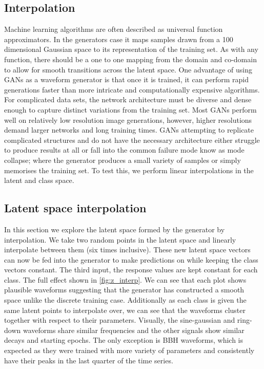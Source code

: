 \documentclass[12pt]{iopart}
\begin{document}
\subsection{Interpolation}
Machine learning algorithms are often described as universal function approximators. In the generators case it maps samples drawn from a 100 dimensional Gaussian space to its representation of the training set. As with any function, there should be a one to one mapping from the domain and co-domain to allow for smooth transitions across the latent space. One advantage of using GANs as a waveform generator is that once it is trained, it can perform rapid generations faster than more intricate and computationally expensive algorithms. For complicated data sets, the network architecture must be diverse and dense enough to capture distinct variations from the training set. Most GANs perform well on relatively low resolution image generations, however, higher resolutions demand larger networks and long training times. GANs attempting to replicate complicated structures and do not have the necessary architecture either struggle to produce results at all or fall into the common failure mode know as mode collapse; where the generator produces a small variety of samples or simply memorises the training set. To test this, we perform linear interpolations in the latent and class space. 

\subsection{Latent space interpolation}
In this section we explore the latent space formed by the generator by interpolation. We take two random points in the latent space and linearly interpolate between them (six times inclusive). These new latent space vectors can now be fed into the generator to make predictions on while keeping the class vectors constant. The third input, the response values are kept constant for each class. The full effect shown in \cref{fig:z_interp}. We can see that each plot shows plausible waveforms suggesting that the generator has constructed a smooth space unlike the discrete training case. Additionally as each class is given the same latent points to interpolate over, we can see that the waveforms cluster together with respect to their parameters. Visually, the sine-gaussian and ring-down waveforms share similar frequencies and the other signals show similar decays and starting epochs. The only exception is BBH waveforms, which is expected as they were trained with more variety of parameters and consistently have their peaks in the last quarter of the time series.
\end{document}
